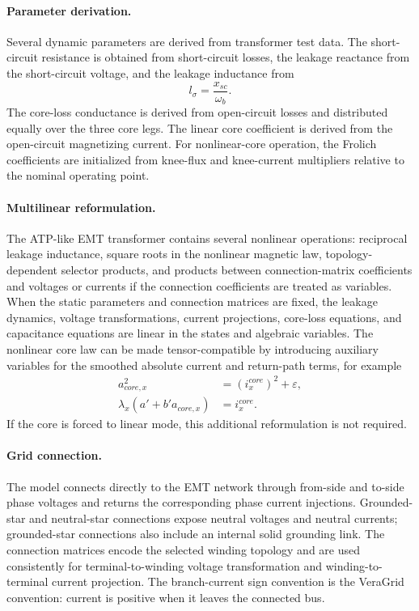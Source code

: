 \paragraph{Parameter derivation.}
Several dynamic parameters are derived from transformer test data. The short-circuit resistance is obtained from short-circuit losses, the leakage reactance from the short-circuit voltage, and the leakage inductance from
\begin{equation}
    l_\sigma = \frac{x_{sc}}{\omega_b}.
\end{equation}
The core-loss conductance is derived from open-circuit losses and distributed equally over the three core legs. The linear core coefficient is derived from the open-circuit magnetizing current. For nonlinear-core operation, the Frolich coefficients are initialized from knee-flux and knee-current multipliers relative to the nominal operating point.

\paragraph{Multilinear reformulation.}
The ATP-like EMT transformer contains several nonlinear operations: reciprocal leakage inductance, square roots in the nonlinear magnetic law, topology-dependent selector products, and products between connection-matrix coefficients and voltages or currents if the connection coefficients are treated as variables. When the static parameters and connection matrices are fixed, the leakage dynamics, voltage transformations, current projections, core-loss equations, and capacitance equations are linear in the states and algebraic variables. The nonlinear core law can be made tensor-compatible by introducing auxiliary variables for the smoothed absolute current and return-path terms, for example
\begin{align}
    a_{core,x}^2 &= {(i^{core}_x)}^2+\varepsilon, \\
    \lambda_x\left(a' + b'a_{core,x}\right) &= i^{core}_x.
\end{align}
If the core is forced to linear mode, this additional reformulation is not required.

\paragraph{Grid connection.}
The model connects directly to the EMT network through from-side and to-side phase voltages and returns the corresponding phase current injections. Grounded-star and neutral-star connections expose neutral voltages and neutral currents; grounded-star connections also include an internal solid grounding link. The connection matrices encode the selected winding topology and are used consistently for terminal-to-winding voltage transformation and winding-to-terminal current projection. The branch-current sign convention is the VeraGrid convention: current is positive when it leaves the connected bus.
